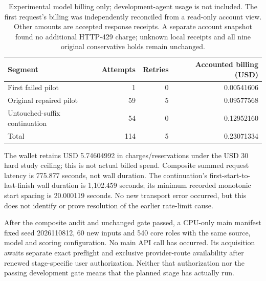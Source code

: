 \begin{table}[t]
\centering
\small
\begin{tabular}{lrrr}
\toprule
Segment & Attempts & Retries & Accounted billing (USD)\\
\midrule
First failed pilot & 1 & 0 & 0.00541606\\
Original repaired pilot & 59 & 5 & 0.09577568\\
Untouched-suffix continuation & 54 & 0 & 0.12952160\\
\midrule
Total & 114 & 5 & 0.23071334\\
\bottomrule
\end{tabular}
\caption{Experimental model billing only; development-agent usage is not
included. The first request's billing was independently reconciled from a
read-only account view. Other amounts are accepted response receipts. A separate
account snapshot found no additional HTTP-429 charge; unknown local receipts and
all nine original conservative holds remain unchanged.}
\label{tab:cost}
\end{table}

The wallet retains USD 5.74604992 in charges/reservations under the USD 30 hard
study ceiling; this is not actual billed spend. Composite summed request latency
is 775.877 seconds, not wall duration. The continuation's first-start-to-last-finish
wall duration is 1,102.459 seconds; its minimum recorded monotonic start spacing
is 20.000119 seconds. No new transport error occurred, but this does not identify
or prove resolution of the earlier rate-limit cause.

After the composite audit and unchanged gate passed, a CPU-only main manifest
fixed seed 2026110812, 60 new inputs and 540 core roles with the same source,
model and scoring configuration. No main API call has occurred. Its acquisition
awaits separate exact preflight and exclusive provider-route availability after
renewed stage-specific user authorization. Neither that authorization nor the
passing development gate means that the planned stage has actually run.